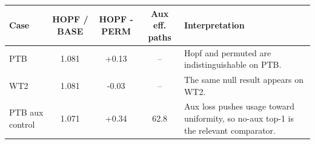\begin{tabularx}{0.94\linewidth}{@{}lcccX@{}}
\toprule
Case & HOPF / BASE & HOPF - PERM & Aux eff. paths & Interpretation \\
\midrule
PTB & 1.081 & +0.13 & -- & Hopf and permuted are indistinguishable on PTB. \\
WT2 & 1.081 & -0.03 & -- & The same null result appears on WT2. \\
PTB aux control & 1.071 & +0.34 & 62.8 & Aux loss pushes usage toward uniformity, so no-aux top-1 is the relevant comparator. \\
\bottomrule
\end{tabularx}
